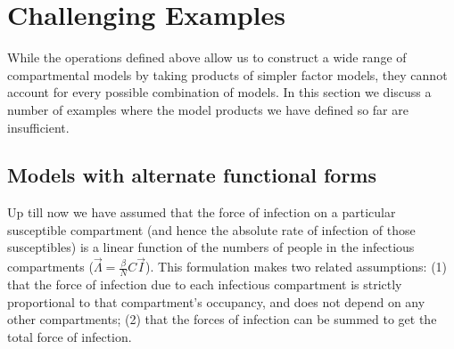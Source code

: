 \section{Challenging Examples}\label{unco}
While the operations defined above allow us to construct a wide range of compartmental models by taking products of simpler factor models, they cannot account for every possible combination of models. In this section we discuss a number of examples where the model products we have defined so far are insufficient.

\subsection{Models with alternate functional forms}\label{aff}


Up till now we have assumed that the force of infection on a particular susceptible compartment (and hence the absolute rate of infection of those susceptibles) is a linear function of the numbers of people in the infectious compartments ($\vec{\Lambda} = \frac{\beta}{N} C \vec{I}$). This formulation makes two related assumptions: (1) that the force of infection due to each infectious compartment is strictly proportional to that compartment's occupancy, and does not depend on any other compartments; (2) that the forces of infection can be summed to get the total force of infection.

